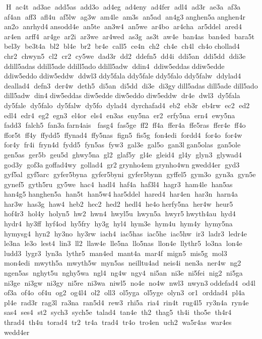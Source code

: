 H  ac4t  ad3ae  add5as  add3o  ad4eg  ad4eny  ad4fer  adl4  ad3r  ae3a  af3a  af4an  aff3  afl4u  af5lw  ag3w  am4le  am3s  an5ad  an4g3 	 anghen5a 	 anghen4r  an2o  anrhyd4 	 ansodd4e  an5te  an3w4  an5we  ar4bo  ar4cha  ar5ddel  ared4  ar4en  arff4  ar4ge  ar2i  ar3we  ar4wed  as3g  as3t  aw4e  ban4as  ban4ed  bara5t  bel3y  be3t4a  bl2  bl4e  br2  br4e  call5  ce4n  ch2  ch4e  ch4l  ch4o 	 chollad4  chr2  chwyn5  cl2  cr2  cy5we  dad3r  dd2  ddefn5  dd4i  ddi5an  ddi5dd  ddi3e  ddill5adas 
 ddill5ade 
 ddill5ado 
 ddill5adw  ddin4  ddiw5eddas 
 ddiw5edde 
 ddiw5eddo 
 ddiw5eddw  ddwl3 	 ddy5fala 	 ddy5fale 	 ddy5falo 	 ddy5falw  ddylad4 	 deallad4  defn3  der4w  deth5  di5an  di5dd  di3e  di3gy 
 dill5adas 	 dill5ade 	 dill5ado 	 dill5adw  din4 
 diw5eddas 	 diw5edde 	 diw5eddo 	 diw5eddw  dr4e  dwl3  dy5fala  dy5fale  dy5falo  dy5falw  dy5fo  dylad4  dyrchafad4  eb2  eb3r  eb4rw  ec2  ed2  edl4  edr4  eg2  egn3  el4or  els4  en3as  eny5na  er2  erfy5na  ern4  ewy5na  fadd3  falch5  fan3a 
 farn4ais   fasg4  fas5ge  ff2  ff4a  ffer4a  ffe5ras  ffer4e  ff4o  ffor5t  ff4y  ffydd5  ffynad4  ffy5nas  fign5  fis5g  fon4edi  fordd4  for4o  for4w  for4y  fr4i  fryn4d  fydd5  fyn5as  fyw3  gal3e  gal5o  gan3l 	 gan5olas  gan5ole  gen5as  ger5b  geu5d  ghwy5na  gl2  glaf5y  gl4e  gleid4  gl4y  glyn3  glywad4  god3y  gof3a 
 goffad4wy  gollad4  gr2 
 grynho4em 
 grynho4wn 	 gwedd4er  gyd3  gyf5al  gyf5arc  gyfer5byna  gyfer5byni  gyfer5bynn  gyffel5  gym3o  gyn3a  gyn5e  gynef5  gyth5ru  gy5we  hac4  hadl4  haf4a  haf3l4  hagr3  ham4le  han5as  han4g5 
 hanghen5a  han5t  han5w4 	 har5ddel  hared4  har4en  har3n  harn4a  har3w  has3g  haw4  heb2  hec2  hed2  hedl4  he4o 	 herfy5na  her4w  heur5  hof4r3  hol4y  holyn5  hw2  hwn4  hwyl5u  hwyn5a  hwyr5 	 hwyth4au  hyd4  hydr4  hy3ff  hyf4od  hy5fry  hy3g  hyl4  hym3e  hym4u  hym4y  hymy5na  hymysg4  hyn2  hy3no  hy3rw  iach4  iac5has  iac5he  iac5hw  ir3  ladr3  ledr4e  le3na  le3o  lest4  lin3  ll2  llaw4e  lle5na  llo5nas  llon4e  llythr5  lo3na  lon4e  ludd3  lygr3  lyn3a  lythr5  man4ed  mant4a  mar4f  mign5  mis5g  mol3  mon4edi  mwyth5a  mwyth5w  myn5as  neilltu4ad  neis4i  nen3a  ner4w  ng2  ngen5as  nghyt5u  nghy5wa  ngl4  ng4w  ngy4  ni5an  ni3e  ni5fei  nig2  ni5ga  ni3ge  ni3gw  ni3gy  ni5re  ni3wa  niwl5  no4e  no4w  nwl3  nwyn3 	 oddefad4  od4l  of3a  of4o  of4u  og2  og4l4  ol2  oll3  ol5yga  ol5yge  olyn3  or1  orddad4  pl4a  pl4e  rad3r  rag3l  ra3na  ran5d4  rew3  rhi5a  ria4  rin4t  rug4l5  ry3n4a  ryn4e  sas4  ses4  st2  sych3  sych5e  talad4  tan4e  th2  thag5  th4i  tho5e  th4r4  thrad4  th4u  torad4  tr2  tr4a  trad4  tr4o  tro4en  uch2  wa5r4as  war4es  wedd4er 
